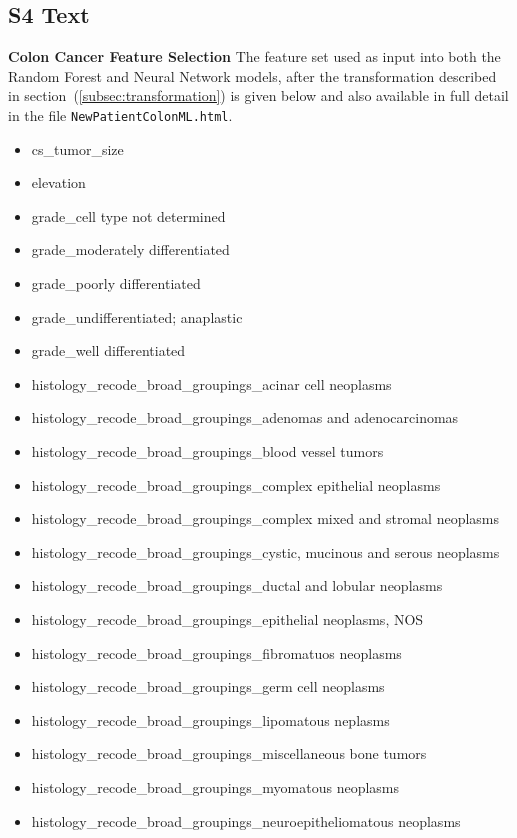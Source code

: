 \documentclass[10pt,letterpaper]{article}
\newcommand{\codewhite}[1]{\colorbox{white}{\texttt{#1}}}
\begin{document}
\subsection*{S4 Text}
\label{S4_Text}

{\bf Colon Cancer Feature Selection} The feature set used as input into both the Random Forest and Neural Network models, after the transformation described in section~(\ref{subsec:transformation}) is given below and also available in full detail in the file 
\codewhite{NewPatientColonML.html}.


\begin{itemize}[noitemsep]
\item cs\_tumor\_size
\item elevation
\item grade\_cell type not determined
\item grade\_moderately differentiated
\item grade\_poorly differentiated
\item grade\_undifferentiated; anaplastic
\item grade\_well differentiated
\item histology\_recode\_broad\_groupings\_acinar cell neoplasms
\item histology\_recode\_broad\_groupings\_adenomas and adenocarcinomas
\item histology\_recode\_broad\_groupings\_blood vessel tumors
\item histology\_recode\_broad\_groupings\_complex epithelial neoplasms
\item histology\_recode\_broad\_groupings\_complex mixed and stromal neoplasms
\item histology\_recode\_broad\_groupings\_cystic, mucinous and serous neoplasms
\item histology\_recode\_broad\_groupings\_ductal and lobular neoplasms
\item histology\_recode\_broad\_groupings\_epithelial neoplasms, NOS
\item histology\_recode\_broad\_groupings\_fibromatuos neoplasms
\item histology\_recode\_broad\_groupings\_germ cell neoplasms
\item histology\_recode\_broad\_groupings\_lipomatous neplasms
\item histology\_recode\_broad\_groupings\_miscellaneous bone tumors
\item histology\_recode\_broad\_groupings\_myomatous neoplasms
\item histology\_recode\_broad\_groupings\_neuroepitheliomatous neoplasms

\end{itemize}
\end{document}
